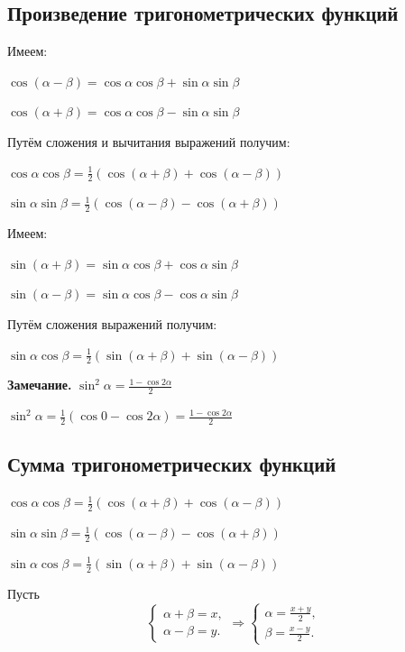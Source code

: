 \documentclass{article}
\begin{document}
        \subsection{Произведение тригонометрических функций}
        
        Имеем:
        
        \(\cos{(\alpha - \beta)} = \cos{\alpha}\cos{\beta} + \sin{\alpha}\sin{\beta}\)
        
        \(\cos{(\alpha + \beta)} = \cos{\alpha}\cos{\beta} - \sin{\alpha}\sin{\beta}\)
        
        Путём сложения и вычитания выражений получим:
        
        \(\cos{\alpha}\cos{\beta} = \frac{1}{2}(\cos{(\alpha + \beta)} + \cos{(\alpha - \beta)})\)
        
        \(\sin{\alpha}\sin{\beta} = \frac{1}{2}(\cos{(\alpha - \beta)} - \cos{(\alpha + \beta)})\)
        
        Имеем:
        
        \(\sin{(\alpha + \beta)} = \sin{\alpha}\cos{\beta} + \cos{\alpha}\sin{\beta}\)
        
        \(\sin{(\alpha - \beta)} = \sin{\alpha}\cos{\beta} - \cos{\alpha}\sin{\beta}\)
        
        Путём сложения выражений получим:
        
        \(\sin{\alpha}\cos{\beta} = \frac{1}{2}(\sin{(\alpha + \beta)} + \sin{(\alpha - \beta)})\)
        
        \textbf{Замечание.} \(\sin^2{\alpha} = \frac{1 - \cos{2\alpha}}{2}\)
        
        \(\sin^2{\alpha} = \frac{1}{2}(\cos{0} - \cos{2\alpha}) = \frac{1 - \cos{2\alpha}}{2}\)
        
        \subsection{Сумма тригонометрических функций}
        
        \(\cos{\alpha}\cos{\beta} = \frac{1}{2}(\cos{(\alpha + \beta)} + \cos{(\alpha - \beta)})\)
        
        \(\sin{\alpha}\sin{\beta} = \frac{1}{2}(\cos{(\alpha - \beta)} - \cos{(\alpha + \beta)})\)
        
        \(\sin{\alpha}\cos{\beta} = \frac{1}{2}(\sin{(\alpha + \beta)} + \sin{(\alpha - \beta)})\)
        
        Пусть \begin{equation}
    			\begin{cases}
      				\alpha + \beta = x,\\
      				\alpha - \beta = y.
    			\end{cases}\Rightarrow
    			\begin{cases}
      				\alpha = \frac{x + y}{2},\\
      				\beta = \frac{x - y}{2}.
    			\end{cases}
			\end{equation}
        
\end{document}
